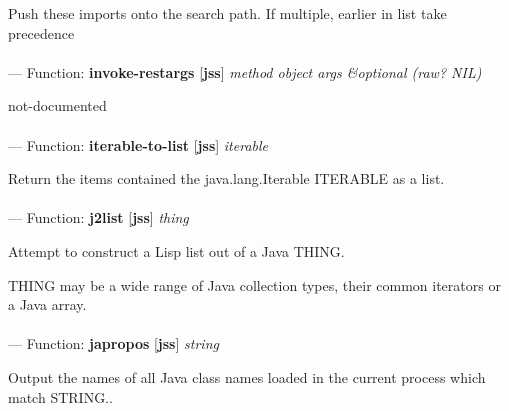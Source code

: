 \begin{adjustwidth}{5em}{5em}
Push these imports onto the search path. If multiple, earlier in list take precedence
\end{adjustwidth}

\paragraph{}
\label{JSS:INVOKE-RESTARGS}
--- Function: \textbf{invoke-restargs} [\textbf{jss}] \textit{method object args \&optional (raw? NIL)}

\begin{adjustwidth}{5em}{5em}
not-documented
\end{adjustwidth}

\paragraph{}
\label{JSS:ITERABLE-TO-LIST}
--- Function: \textbf{iterable-to-list} [\textbf{jss}] \textit{iterable}

\begin{adjustwidth}{5em}{5em}
Return the items contained the java.lang.Iterable ITERABLE as a list.
\end{adjustwidth}

\paragraph{}
\label{JSS:J2LIST}
--- Function: \textbf{j2list} [\textbf{jss}] \textit{thing}

\begin{adjustwidth}{5em}{5em}
Attempt to construct a Lisp list out of a Java THING.

THING may be a wide range of Java collection types, their common
iterators or a Java array.
\end{adjustwidth}

\paragraph{}
\label{JSS:JAPROPOS}
--- Function: \textbf{japropos} [\textbf{jss}] \textit{string}

\begin{adjustwidth}{5em}{5em}
Output the names of all Java class names loaded in the current process which match STRING..
\end{adjustwidth}

